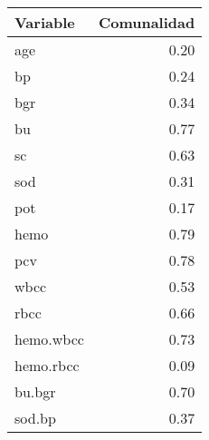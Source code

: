 \begin{table}[ht]
\centering
\begin{tabular}{lr}
  \hline
Variable & Comunalidad \\ 
  \hline
age & 0.20 \\ 
  bp & 0.24 \\ 
  bgr & 0.34 \\ 
  bu & 0.77 \\ 
  sc & 0.63 \\ 
  sod & 0.31 \\ 
  pot & 0.17 \\ 
  hemo & 0.79 \\ 
  pcv & 0.78 \\ 
  wbcc & 0.53 \\ 
  rbcc & 0.66 \\ 
  hemo.wbcc & 0.73 \\ 
  hemo.rbcc & 0.09 \\ 
  bu.bgr & 0.70 \\ 
  sod.bp & 0.37 \\ 
   \hline
\end{tabular}
\end{table}
